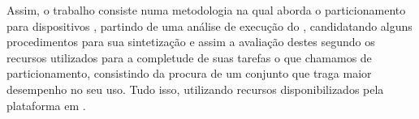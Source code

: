       Assim, o trabalho consiste numa metodologia na qual aborda o particionamento para dispositivos \wearables, partindo de uma análise de execução do \software, candidatando alguns procedimentos para sua sintetização e assim a avaliação destes segundo os recursos utilizados para a completude de suas tarefas o que chamamos de particionamento, consistindo da procura de um conjunto que traga maior desempenho no seu uso.
      Tudo isso, utilizando recursos disponibilizados pela plataforma em \hardware.
